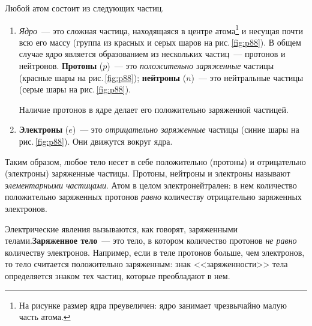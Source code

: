\documentclass[main.tex]{subfiles}
\begin{document}
Любой атом состоит из следующих частиц.
\begin{enumerate}
    \item \emph{Ядро}~--- это сложная частица, находящаяся в центре атома\footnote{На рисунке размер ядра преувеличен: ядро занимает чрезвычайно малую часть атома.} и несущая почти всю его массу (группа из красных и серых шаров на рис.\,\ref{fig:p88}). В общем случае ядро является образованием из нескольких частиц~--- протонов и нейтронов. \textbf{Протоны} ($p$)~--- это \emph{положительно заряженные} частицы (красные шары на рис.\,\ref{fig:p88}); \textbf{нейтроны} ($n$)~--- это нейтральные частицы (серые шары на рис.\,\ref{fig:p88}). 

    Наличие протонов в ядре делает его положительно заряженной частицей.
    \item \textbf{Электроны} ($e$)~--- это \emph{отрицательно заряженные} частицы (синие шары на рис.\,\ref{fig:p88}). Они движутся вокруг ядра.
\end{enumerate}

Таким образом, любое тело несет в себе положительно (протоны) и отрицательно (электроны) заряженные частицы. Протоны, нейтроны и электроны называют \emph{элементарными частицами}. Атом в целом электронейтрален: в нем количество положительно заряженных протонов \emph{равно} количеству отрицательно заряженных электронов.

Электрические явления вызываются, как говорят, заряженными телами.\linebreak \textbf{Заряженное тело}~--- это тело, в котором количество протонов \emph{не равно} количеству электронов. Например, если в теле протонов больше, чем электронов, то тело считается положительно заряженным: знак <<заряженности>> тела определяется знаком тех частиц, которые преобладают в нем. 
















 
\end{document}
